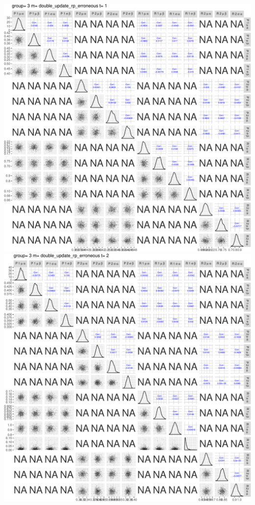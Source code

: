 \documentclass[]{article}
\begin{document}
\includegraphics{compare_models_files/figure-latex/PairsPlots-19.pdf}
\includegraphics{compare_models_files/figure-latex/PairsPlots-20.pdf}
\end{document}
